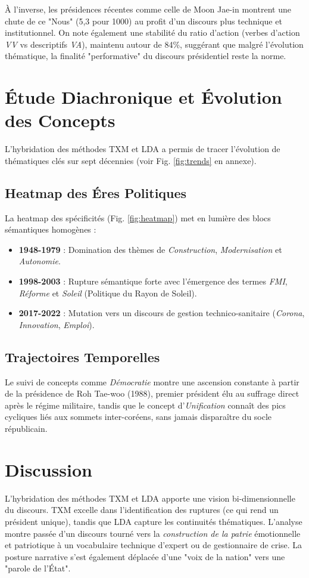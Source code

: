 \documentclass[11pt]{article}
\begin{document}
À l'inverse, les présidences récentes comme celle de Moon Jae-in montrent une chute de ce "Nous" (5,3 pour 1000) au profit d'un discours plus technique et institutionnel. On note également une stabilité du ratio d'action (verbes d'action \textit{VV} vs descriptifs \textit{VA}), maintenu autour de 84\%, suggérant que malgré l'évolution thématique, la finalité "performative" du discours présidentiel reste la norme.

\section{Étude Diachronique et Évolution des Concepts}
L'hybridation des méthodes TXM et LDA a permis de tracer l'évolution de thématiques clés sur sept décennies (voir Fig. \ref{fig:trends} en annexe).

\subsection{Heatmap des Éres Politiques}
La heatmap des spécificités (Fig. \ref{fig:heatmap}) met en lumière des blocs sémantiques homogènes :
\begin{itemize}
    \item \textbf{1948-1979} : Domination des thèmes de \textit{Construction}, \textit{Modernisation} et \textit{Autonomie}.
    \item \textbf{1998-2003} : Rupture sémantique forte avec l'émergence des termes \textit{FMI}, \textit{Réforme} et \textit{Soleil} (Politique du Rayon de Soleil).
    \item \textbf{2017-2022} : Mutation vers un discours de gestion technico-sanitaire (\textit{Corona}, \textit{Innovation}, \textit{Emploi}).
\end{itemize}

\subsection{Trajectoires Temporelles}
Le suivi de concepts comme \textit{Démocratie} montre une ascension constante à partir de la présidence de Roh Tae-woo (1988), premier président élu au suffrage direct après le régime militaire, tandis que le concept d'\textit{Unification} connaît des pics cycliques liés aux sommets inter-coréens, sans jamais disparaître du socle républicain.

\section{Discussion}
L'hybridation des méthodes TXM et LDA apporte une vision bi-dimensionnelle du discours. TXM excelle dans l'identification des ruptures (ce qui rend un président unique), tandis que LDA capture les continuités thématiques. L'analyse montre passée d'un discours tourné vers la \textit{construction de la patrie} émotionnelle et patriotique à un vocabulaire technique d'expert ou de gestionnaire de crise. La posture narrative s'est également déplacée d'une "voix de la nation" vers une "parole de l'État".
\end{document}
